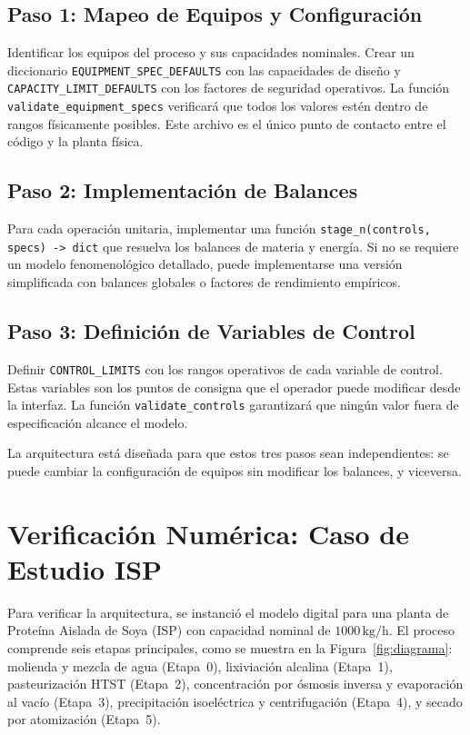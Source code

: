 \documentclass[10pt,letterpaper,twocolumn]{article}
\begin{document}
\subsection{Paso 1: Mapeo de Equipos y Configuración}

Identificar los equipos del proceso y sus capacidades nominales. Crear un diccionario \texttt{EQUIPMENT\_SPEC\_DEFAULTS} con las capacidades de diseño y \texttt{CAPACITY\_LIMIT\_DEFAULTS} con los factores de seguridad operativos. La función \texttt{validate\_equipment\_specs} verificará que todos los valores estén dentro de rangos físicamente posibles. Este archivo es el único punto de contacto entre el código y la planta física.

\subsection{Paso 2: Implementación de Balances}

Para cada operación unitaria, implementar una función \texttt{stage\_n(controls, specs) -> dict} que resuelva los balances de materia y energía. Si no se requiere un modelo fenomenológico detallado, puede implementarse una versión simplificada con balances globales o factores de rendimiento empíricos.

\subsection{Paso 3: Definición de Variables de Control}

Definir \texttt{CONTROL\_LIMITS} con los rangos operativos de cada variable de control. Estas variables son los puntos de consigna que el operador puede modificar desde la interfaz. La función \texttt{validate\_controls} garantizará que ningún valor fuera de especificación alcance el modelo.

La arquitectura está diseñada para que estos tres pasos sean independientes: se puede cambiar la configuración de equipos sin modificar los balances, y viceversa.

\section{Verificación Numérica: Caso de Estudio ISP}

Para verificar la arquitectura, se instanció el modelo digital para una planta de Proteína Aislada de Soya (ISP) con capacidad nominal de $1000\,\text{kg/h}$. El proceso comprende seis etapas principales, como se muestra en la Figura~\ref{fig:diagrama}: molienda y mezcla de agua (Etapa~0), lixiviación alcalina (Etapa~1), pasteurización HTST (Etapa~2), concentración por ósmosis inversa y evaporación al vacío (Etapa~3), precipitación isoeléctrica y centrifugación (Etapa~4), y secado por atomización (Etapa~5).
\end{document}
